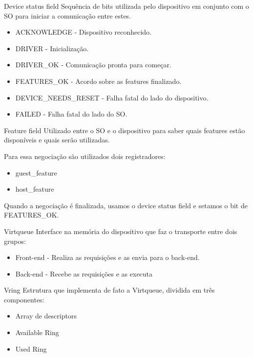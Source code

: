 \documentclass[brazil,nolapesd,aspectratio=169,noartschool]{lapesd-slides}
\begin{document}
\begin{frame}{Device status field}
	Sequência de bits utilizada pelo dispositivo em conjunto com o SO para iniciar a comunicação entre estes.

	\begin{itemize}
		\item ACKNOWLEDGE - Dispositivo reconhecido.
		\item DRIVER - Inicialização.
		\item DRIVER{\_}OK - Comunicação pronta para começar.
		\item FEATURES{\_}OK - Acordo sobre as features finalizado.
		\item DEVICE{\_}NEEDS{\_}RESET - Falha fatal do lado do dispositivo.
		\item FAILED - Falha fatal do lado do SO.
	\end{itemize}
\end{frame}

\begin{frame}{Feature field}
	Utilizado entre o SO e o dispositivo para saber quais features estão disponíveis e quais serão utilizadas.

	Para essa negociação são utilizados dois registradores:
	\begin{itemize}
		\item guest{\_}feature
		\item host{\_}feature
	\end{itemize}

	Quando a negociação é finalizada, usamos o device status field e setamos o bit de FEATURES{\_}OK.
\end{frame}

\begin{frame}{Virtqueue}
	Interface na memória do dispositivo que faz o transporte entre dois grupos:

	\begin{itemize}
		\item Front-end - Realiza as requisições e as envia para o back-end.
		\item Back-end - Recebe as requisições e as executa
	\end{itemize}


\end{frame}

\begin{frame}{Vring}
	Estrutura que implementa de fato a Virtqueue, dividida em três componentes:

	\begin{itemize}
		\item Array de descriptors
		\item Available Ring
		\item Used Ring
	\end{itemize}
\end{frame}
\end{document}
